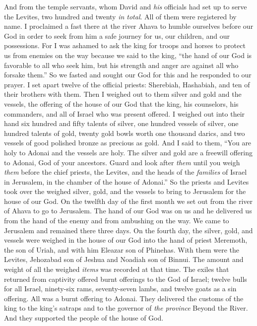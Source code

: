 \begin{biblechapter}
\verse And from the temple servants, whom David and \textit{his} officials had set up to serve the Levites, two hundred and twenty \textit{in total}. All of them were registered by name.
 I proclaimed a fast there at the river Ahava to humble ourselves before our God in order to seek from him a safe journey for us, our children, and our possessions.
\verse For I was ashamed to ask the king for troops and horses to protect us from enemies on the way because we said to the king, “the hand of our God is favorable to all who seek him, but his strength and anger are against all who forsake them.”
\verse So we fasted and sought our God for this and he responded to our prayer.
 I set apart twelve of the official priests: Sherebiah, Hashabiah, and ten of their brothers with them.
\verse Then I weighed out to them silver and gold and the vessels, the offering of the house of our God that the king, his counselors, his commanders, and all of Israel who was present offered.
\verse I weighed out into their hand six hundred and fifty talents of silver, one hundred vessels of silver, one hundred talents of gold,
\verse twenty gold bowls worth one thousand darics, and two vessels of good polished bronze as precious as gold.
\verse And I said to them, “You are holy to Adonai and the vessels are holy. The silver and gold are a freewill offering to Adonai, God of your ancestors.
\verse Guard and look after \textit{them} until you weigh \textit{them} before the chief priests, the Levites, and the heads of the \textit{families} of Israel in Jerusalem, in the chamber of the house of Adonai.”
\verse So the priests and Levites took over the weighed silver, gold, and the vessels to bring to Jerusalem for the house of our God.
 On the twelfth day of the first month we set out from the river of Ahava to go to Jerusalem. The hand of our God was on us and he delivered us from the hand of the enemy and from ambushing on the way.
\verse We came to Jerusalem and remained there three days.
\verse On the fourth day, the silver, gold, and vessels were weighed in the house of our God into the hand of priest Meremoth, the son of Uriah, and with him Eleazar son of Phinehas. With them were the Levites, Jehozabad son of Jeshua and Noadiah son of Binnui.
\verse The amount and weight of all the weighed \textit{items} was recorded at that time.
\verse The exiles that returned from captivity offered burnt offerings to the God of Israel; twelve bulls for all Israel, ninety-six rams, seventy-seven lambs, and twelve goats as a sin offering. All was a burnt offering to Adonai.
\verse They delivered the customs of the king to the king’s satraps and to the governor of \textit{the province} Beyond the River. And they supported the people of the house of God.
\end{biblechapter}

